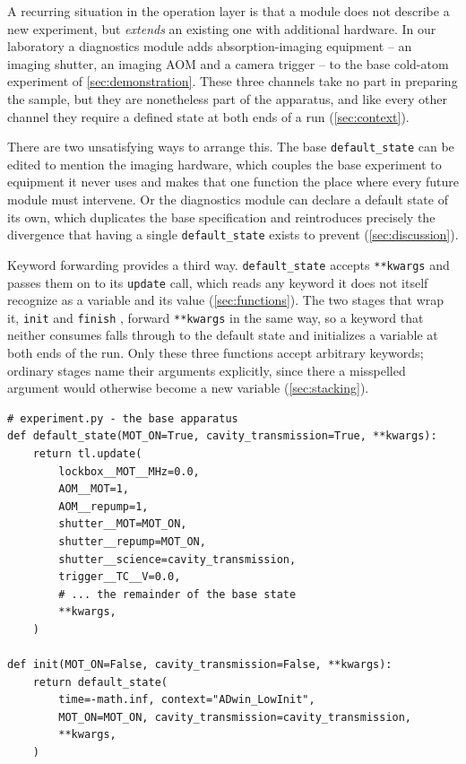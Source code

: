 \documentclass{SciPost}
\newcommand{\python}[1]{%
  \texttt{#1}%
}
\begin{document}
\begin{appendix}
A recurring situation in the operation layer is that a module does not describe a new experiment, but \emph{extends} an existing one with additional hardware. In our laboratory a diagnostics module adds absorption-imaging equipment – an imaging shutter, an imaging AOM and a camera trigger – to the base cold-atom experiment of \cref{sec:demonstration}. These three channels take no part in preparing the sample, but they are nonetheless part of the apparatus, and like every other channel they require a defined state at both ends of a run (\cref{sec:context}).

There are two unsatisfying ways to arrange this. The base \python{default_state} can be edited to mention the imaging hardware, which couples the base experiment to equipment it never uses and makes that one function the place where every future module must intervene. Or the diagnostics module can declare a default state of its own, which duplicates the base specification and reintroduces precisely the divergence that having a single \python{default_state} exists to prevent (\cref{sec:discussion}).

Keyword forwarding provides a third way. \python{default_state} accepts \python{**kwargs} and passes them on to its \python{update} call, which reads any keyword it does not itself recognize as a variable and its value (\cref{sec:functions}). The two stages that wrap it, \python{init} and \python{finish}, forward \python{**kwargs} in the same way, so a keyword that neither consumes falls through to the default state and initializes a variable at both ends of the run. Only these three functions accept arbitrary keywords; ordinary stages name their arguments explicitly, since there a misspelled argument would otherwise become a new variable (\cref{sec:stacking}).

\begin{verbatim}
# experiment.py - the base apparatus
def default_state(MOT_ON=True, cavity_transmission=True, **kwargs):
    return tl.update(
        lockbox__MOT__MHz=0.0,
        AOM__MOT=1,
        AOM__repump=1,
        shutter__MOT=MOT_ON,
        shutter__repump=MOT_ON,
        shutter__science=cavity_transmission,
        trigger__TC__V=0.0,
        # ... the remainder of the base state
        **kwargs,
    )

def init(MOT_ON=False, cavity_transmission=False, **kwargs):
    return default_state(
        time=-math.inf, context="ADwin_LowInit",
        MOT_ON=MOT_ON, cavity_transmission=cavity_transmission,
        **kwargs,
    )


\end{verbatim}
\end{appendix}
\end{document}
